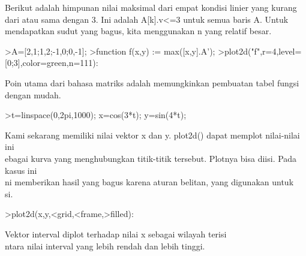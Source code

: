 \documentclass[a4paper,10pt]{article}
\begin{document}
\begin{eulernotebook}
\begin{eulercomment}
\begin{eulercomment}
\begin{eulercomment}
\begin{eulercomment}
\begin{eulercomment}
Berikut adalah himpunan nilai maksimal dari empat kondisi linier yang
kurang dari atau sama dengan 3. Ini adalah A[k].v\textless{}=3 untuk semua baris
A. Untuk mendapatkan sudut yang bagus, kita menggunakan n yang relatif
besar.
\end{eulercomment}
\begin{eulerprompt}
>A=[2,1;1,2;-1,0;0,-1];
>function f(x,y) := max([x,y].A');
>plot2d("f",r=4,level=[0;3],color=green,n=111):
\end{eulerprompt}
\begin{eulercomment}
Poin utama dari bahasa matriks adalah memungkinkan pembuatan tabel
fungsi dengan mudah.
\end{eulercomment}
\begin{eulerprompt}
>t=linspace(0,2pi,1000); x=cos(3*t); y=sin(4*t);
\end{eulerprompt}
\begin{eulercomment}
Kami sekarang memiliki nilai vektor x dan y. plot2d() dapat memplot
nilai-nilai ini\\
ebagai kurva yang menghubungkan titik-titik tersebut. Plotnya bisa
diisi. Pada kasus ini\\
ni memberikan hasil yang bagus karena aturan belitan, yang digunakan
untuk\\
si.
\end{eulercomment}
\begin{eulerprompt}
>plot2d(x,y,<grid,<frame,>filled):
\end{eulerprompt}
\begin{eulercomment}
Vektor interval diplot terhadap nilai x sebagai wilayah terisi\\
ntara nilai interval yang lebih rendah dan lebih tinggi.


\end{eulercomment}
\end{eulercomment}
\end{eulercomment}
\end{eulercomment}
\end{eulercomment}
\end{eulernotebook}
\end{document}
